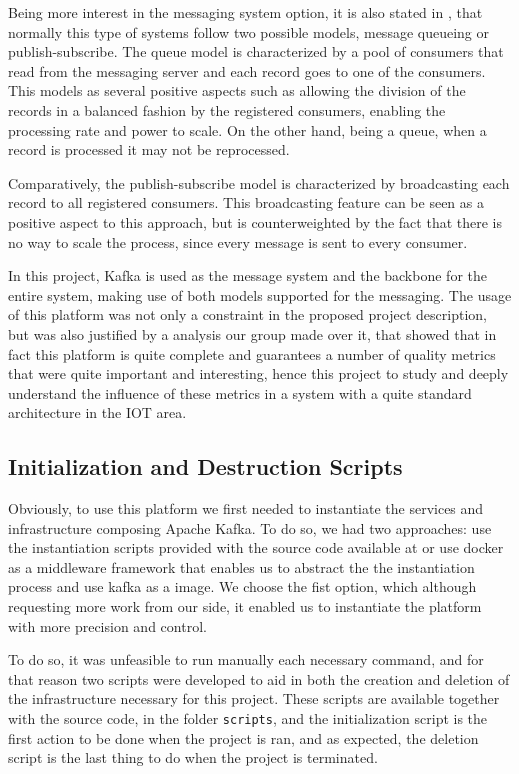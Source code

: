\documentclass[12pt]{article}
\begin{document}
Being more interest in the messaging system option, it is also stated in \cite{kafka}, that normally this type of systems follow two possible models, message queueing or publish-subscribe. The queue model is characterized by a pool of consumers that read from the messaging server and each record goes to one of the consumers. This models as several positive aspects such as allowing the division of the records in a balanced fashion by the registered consumers, enabling the processing rate and power to scale. On the other hand, being a queue, when a record is processed it may not be reprocessed.

Comparatively, the publish-subscribe model is characterized by broadcasting each record to all registered consumers. This broadcasting feature can be seen as a positive aspect to this approach, but is counterweighted by the fact that there is no way to scale the process, since every message is sent to every consumer.

In this project, Kafka is used as the message system and the backbone for the entire system, making use of both models supported for the messaging. The usage of this platform was not only a constraint in the proposed project description, but was also justified by a analysis our group made over it, that showed that in fact this platform is quite complete and guarantees a number of quality metrics that were quite important and interesting, hence this project to study and deeply understand the influence of these metrics in a system with a quite standard architecture in the IOT area. 

\subsection{Initialization and Destruction Scripts} %
Obviously, to use this platform we first needed to instantiate the services and infrastructure composing Apache Kafka. To do so, we had two approaches: use the instantiation scripts provided with the source code available at \cite{kafka} or use docker as a middleware framework that enables us to abstract the the instantiation process and use kafka as a image. We choose the fist option, which although requesting more work from our side, it enabled us to instantiate the platform with more precision and control.

To do so, it was unfeasible to run manually each necessary command, and for that reason two scripts were developed to aid in both the creation and deletion of the infrastructure necessary for this project. These scripts are available together with the source code, in the folder \texttt{scripts}, and the initialization script is the first action to be done when the project is ran, and as expected, the deletion script is the last thing to do when the project is terminated.
\end{document}
